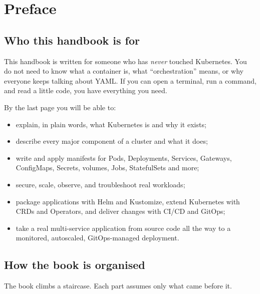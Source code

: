 \chapter*{Preface}

\section*{Who this handbook is for}

This handbook is written for someone who has \emph{never} touched Kubernetes.
You do not need to know what a container is, what ``orchestration'' means, or
why everyone keeps talking about YAML. If you can open a terminal, run a
command, and read a little code, you have everything you need.

By the last page you will be able to:

\begin{itemize}
  \item explain, in plain words, what Kubernetes is and why it exists;
  \item describe every major component of a cluster and what it does;
  \item write and apply manifests for Pods, Deployments, Services, Gateways,
        ConfigMaps, Secrets, volumes, Jobs, StatefulSets and more;
  \item secure, scale, observe, and troubleshoot real workloads;
  \item package applications with Helm and Kustomize, extend Kubernetes with
        CRDs and Operators, and deliver changes with CI/CD and GitOps;
  \item take a real multi-service application from source code all the way to a
        monitored, autoscaled, GitOps-managed deployment.
\end{itemize}

\section*{How the book is organised}

The book climbs a staircase. Each part assumes only what came before it.

